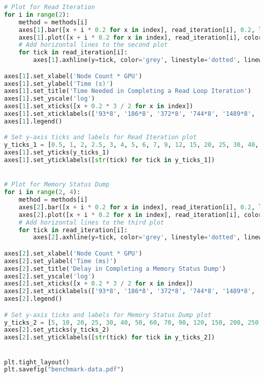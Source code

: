 \begin{lstlisting}[language=Python]
# Plot for Read Iteration
for i in range(2):
    method = methods[i]
    axes[1].bar([x + i * 0.2 for x in index], read_iteration[i], 0.2, label=method, color=colors[i])
    axes[1].plot([x + i * 0.2 for x in index], read_iteration[i], color=colors[i], marker='o', linewidth=1, markersize=2)
    # Add horizontal lines to the second plot
    for tick in read_iteration[i]:
        axes[1].axhline(y=tick, color='grey', linestyle='dotted', linewidth=0.3)

axes[1].set_xlabel('Node Count * GPU')
axes[1].set_ylabel('Time (s)')
axes[1].set_title('Time Needed in Completing a Read Loop Iteration')
axes[1].set_yscale('log')
axes[1].set_xticks([x + 0.2 * 3 / 2 for x in index])
axes[1].set_xticklabels(['93*8', '186*8', '372*8', '744*8', '1489*8', '2978*8'])
axes[1].legend()

# Set y-axis ticks and labels for Read Iteration plot
y_ticks_1 = [0.5, 1, 2, 2.5, 3, 4, 5, 6, 7, 9, 12, 15, 20, 25, 30, 40, 50, 60]
axes[1].set_yticks(y_ticks_1)
axes[1].set_yticklabels([str(tick) for tick in y_ticks_1])


# Plot for Memory Status Dump
for i in range(2, 4):
    method = methods[i]
    axes[2].bar([x + i * 0.2 for x in index], read_iteration[i], 0.2, label=method, color=colors[i])
    axes[2].plot([x + i * 0.2 for x in index], read_iteration[i], color=colors[i], marker='o', linewidth=1, markersize=2)
    # Add horizontal lines to the third plot
    for tick in read_iteration[i]:
        axes[2].axhline(y=tick, color='grey', linestyle='dotted', linewidth=0.3)

axes[2].set_xlabel('Node Count * GPU')
axes[2].set_ylabel('Time (ms)')
axes[2].set_title('Delay in Completing a Memory Status Dump')
axes[2].set_yscale('log')
axes[2].set_xticks([x + 0.2 * 3 / 2 for x in index])
axes[2].set_xticklabels(['93*8', '186*8', '372*8', '744*8', '1489*8', '2978*8'])
axes[2].legend()

# Set y-axis ticks and labels for Memory Status Dump plot
y_ticks_2 = [5, 10, 20, 25, 30, 40, 50, 60, 70, 90, 120, 150, 200, 250, 300, 400, 500]
axes[2].set_yticks(y_ticks_2)
axes[2].set_yticklabels([str(tick) for tick in y_ticks_2])


plt.tight_layout()
plt.savefig("benchmark-data.pdf")
\end{lstlisting}
